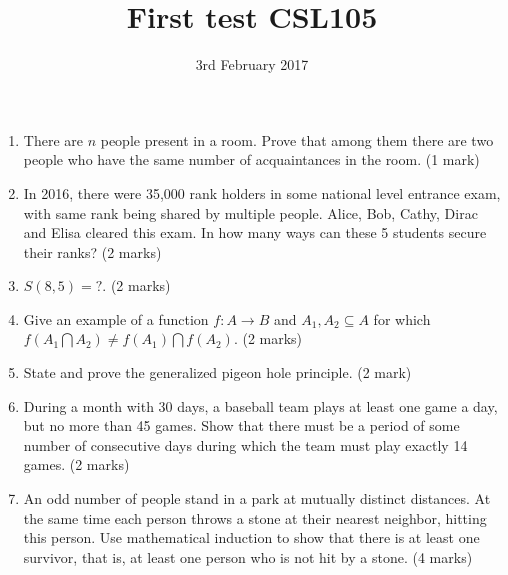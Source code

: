 \documentclass{article}
\title{First test CSL105}
\date{3rd February 2017}
\begin{document}
\maketitle

\begin{enumerate}
    \item There are $n$ people present in a room. Prove that among them there are two people who
        have the same number of acquaintances in the room. (1 mark)
    \item In 2016, there were 35,000 rank holders in some national level entrance exam, with same rank being shared by 
        multiple people. Alice, Bob, Cathy, Dirac and Elisa cleared this exam. In how many ways can these 5 students secure their ranks? (2 marks)
    \item $S(8,5)=?$. (2 marks)
    \item Give an example of a function $f:A\rightarrow B$ and $A_1, A_2\subseteq A$ for which $f(A_1\bigcap A_2)\neq f(A_1)\bigcap f(A_2)$. (2 marks)
    \item State and prove the generalized pigeon hole principle. (2 mark)
    \item During a month with 30 days, a baseball team plays at least one game a day, but no more than 45 games. Show that there 
        must be a period of some number of consecutive days during which the team must play exactly 14 games. (2 marks)
    \item An odd number of people stand in a park at mutually distinct distances. At the same time each person throws a stone at their nearest 
        neighbor, hitting this person. Use mathematical induction to show that there is at least one survivor, that is, at least one person who is not hit by a stone. (4 marks)

\end{enumerate}
\end{document}
